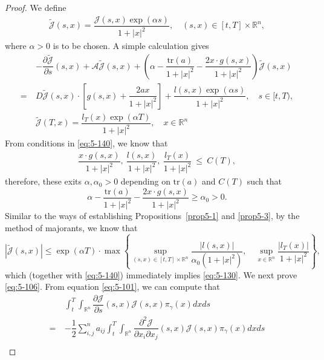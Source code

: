 \documentclass[11pt]{article}
\numberwithin{equation}{section}
\newcommand{\brn}{{\mathbb{R}^n}}
\newcommand{\1}{\mbox{1\hspace{-1mm}I}}
\begin{document}
\begin{proof}
We define 
\begin{align*}
    \widetilde{\mathcal{J}}(s,x)=\dfrac{\mathcal{J}(s,x)\exp(\alpha s)}{1+|x|^{2}},\quad (s,x)\in[t,T]\times\brn,
\end{align*}
where $\alpha>0$ is to be chosen. A simple calculation gives
\begin{align*}
    &-\dfrac{\partial\widetilde{\mathcal{J}}}{\partial s}(s,x)+\mathcal{A}\widetilde{\mathcal{J}}(s,x)+\left(\alpha-\dfrac{\text{tr}(a)}{1+|x|^{2}}-\dfrac{2x\cdot g(s,x)}{1+|x|^{2}}\right)\widetilde{\mathcal{J}}(s,x)\\
    =\ & D\widetilde{\mathcal{J}}(s,x)\cdot \left[g(s,x)+\dfrac{2ax}{1+|x|^{2}}\right]+\dfrac{l(s,x)\exp(\alpha s)}{1+|x|^{2}},\quad s\in[t,T),\\
    &\widetilde{\mathcal{J}}(T,x)=\dfrac{l_{T}(x)\exp(\alpha T)}{1+|x|^{2}},\quad x\in\brn
\end{align*}
From conditions in \eqref{eq:5-140}, we know that
\begin{align*}
    \dfrac{x\cdot g(s,x)}{1+|x|^{2}},\ \dfrac{l(s,x)}{1+|x|^{2}},\ \dfrac{l_{T}(x)}{1+|x|^{2}}\ \le\ C(T),
\end{align*}
therefore, these exits $\alpha,\alpha_0>0$ depending on $\text{tr}(a)$ and $C(T)$ such that
\begin{equation*}\label{eq:5-142}
    \alpha-\dfrac{\text{tr}(a)}{1+|x|^{2}}-\dfrac{2x\cdot g(s,x)}{1+|x|^{2}}\geq\alpha_{0}>0.
\end{equation*}
Similar to the ways of establishing Propositions~\ref{prop5-1} and \ref{prop5-3}, by the method of majorants, %
we know that
\begin{equation*}\label{eq:5-143}
    \left|\widetilde{\mathcal{J}}(s,x)\right|\le \exp(\alpha T)\cdot \max\left\{\sup_{(s,x)\in[t,T]\times\brn}\dfrac{|l(s,x)|}{\alpha_0\left(1+|x|^{2}\right)},\quad \sup_{x\in\brn}\dfrac{|l_{T}(x)|}{1+|x|^{2}}\right\},
\end{equation*}
which (together with \eqref{eq:5-140}) immediately implies \eqref{eq:5-130}. We next prove \eqref{eq:5-106}. From equation \eqref{eq:5-101}, we can compute that
\begin{align*}
    &\int_{t}^{T}\int_{\brn}\dfrac{\partial \mathcal{J}}{\partial s}(s,x)\mathcal{J}(s,x)\pi_{\gamma}(x)dxds\\
    =\ &-\dfrac{1}{2}\sum_{i,j}^n a_{ij}\int_{t}^{T}\int_{\brn}\dfrac{\partial^{2}\mathcal{J}}{\partial x_{i}\partial x_{j}}(s,x)\mathcal{J}(s,x)\pi_{\gamma}(x)dxds\\

\end{align*}
\end{proof}
\end{document}

